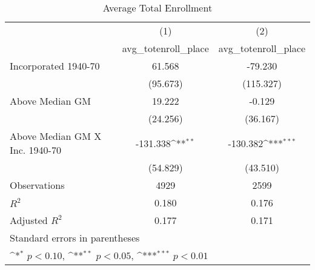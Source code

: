 \begin{table}[htbp]\centering
\def\sym#1{\ifmmode^{#1}\else\(^{#1}\)\fi}
\caption{Average Total Enrollment}
\begin{tabular}{l*{2}{c}}
\hline\hline
                    &\multicolumn{1}{c}{(1)}&\multicolumn{1}{c}{(2)}\\
                    &\multicolumn{1}{c}{avg\_totenroll\_place}&\multicolumn{1}{c}{avg\_totenroll\_place}\\
\hline
Incorporated 1940-70&      61.568         &     -79.230         \\
                    &    (95.673)         &   (115.327)         \\
[1em]
Above Median GM     &      19.222         &      -0.129         \\
                    &    (24.256)         &    (36.167)         \\
[1em]
Above Median GM X Inc. 1940-70&    -131.338\sym{**} &    -130.382\sym{***}\\
                    &    (54.829)         &    (43.510)         \\
\hline
Observations        &        4929         &        2599         \\
\(R^{2}\)           &       0.180         &       0.176         \\
Adjusted \(R^{2}\)  &       0.177         &       0.171         \\
\hline\hline
\multicolumn{3}{l}{\footnotesize Standard errors in parentheses}\\
\multicolumn{3}{l}{\footnotesize \sym{*} \(p<0.10\), \sym{**} \(p<0.05\), \sym{***} \(p<0.01\)}\\
\end{tabular}
\end{table}
